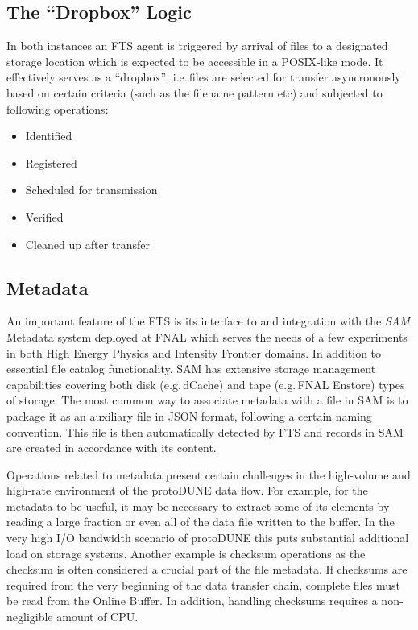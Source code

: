 \documentclass[a4paper]{jpconf}
\newcommand{\pd}{protoDUNE\xspace}
\begin{document}
\subsection{The ``Dropbox'' Logic}
In both instances an FTS agent is triggered by arrival of files to a designated
storage location which is expected to be accessible in a POSIX-like  mode.
It effectively serves as a ``dropbox'', i.e.\,files are selected
for transfer asyncronously based on certain criteria (such as the filename pattern etc)
and subjected to following operations:
\begin{itemize}
\item Identified
\item Registered
\item Scheduled for transmission
\item Verified
\item Cleaned up after transfer
\end{itemize}


\subsection{Metadata}
An important feature of the FTS is its interface to and integration with 
the \textit{SAM} Metadata system deployed at FNAL which serves the needs of a few
experiments in both High Energy Physics and Intensity Frontier domains. In addition to essential file catalog
functionality, SAM has extensive storage management
capabilities covering both disk (e.g.\,dCache) and tape (e.g.\,FNAL Enstore) types of storage.
The most common way
to associate metadata with a file in SAM is to package it as an auxiliary file in JSON format,
following a certain naming convention. This file is then automatically detected by FTS
and records in SAM are created in accordance with its content.

Operations related to metadata present certain challenges in the high-volume and high-rate
environment of the \pd data flow. For example, for the metadata to be useful, it may
be necessary to extract some of its elements by reading a large fraction or even all of the data file
written to the buffer. In the very high I/O bandwidth scenario of \pd this puts substantial additional
load on storage systems. Another example is checksum operations as the checksum is often
considered a crucial part of the file metadata. If checksums are required from the very beginning
of the data transfer chain, complete files must be read from the Online Buffer. In addition, handling
checksums requires a non-negligible amount of CPU.
\end{document}
